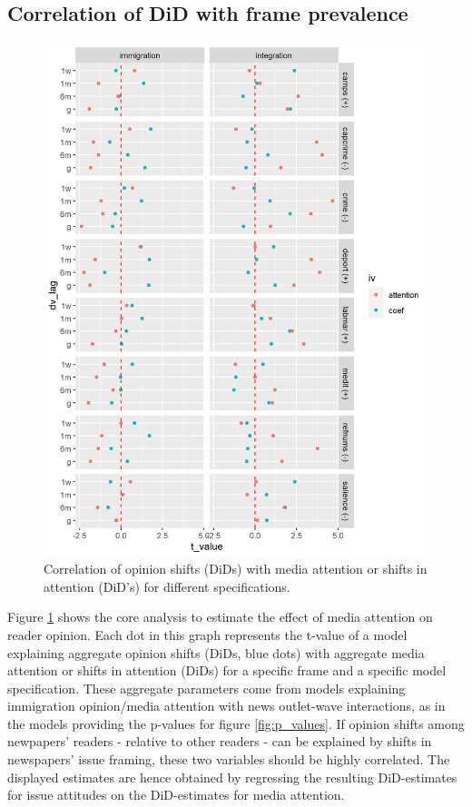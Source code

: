 \documentclass{article}
\begin{document}
\subsection{Correlation of DiD with frame prevalence}
\begin{figure}[!ht]
    \centering
    \includegraphics[width=\textwidth]{paper/vis/effectplot_noimp.png}
    \caption{Correlation of opinion shifts (DiDs) with media attention or shifts in attention (DiD's) for different specifications.}
    \label{fig:did_corr}
\end{figure}

Figure \ref{fig:did_corr} shows the core analysis to estimate the effect of media attention on reader opinion. Each dot in this graph represents the t-value of a model explaining aggregate opinion shifts (DiDs, blue dots) with aggregate media attention or shifts in attention (DiDs) for a specific frame and a specific model specification. These aggregate parameters come from models explaining immigration opinion/media attention with news outlet-wave interactions, as in the models providing the p-values for figure \ref{fig:p_values}. If opinion shifts among newpapers' readers - relative to other readers - can be explained by shifts in newspapers' issue framing, these two variables should be highly correlated. The displayed estimates are hence obtained by regressing the resulting DiD-estimates for issue attitudes on the DiD-estimates for media attention.
\end{document}
